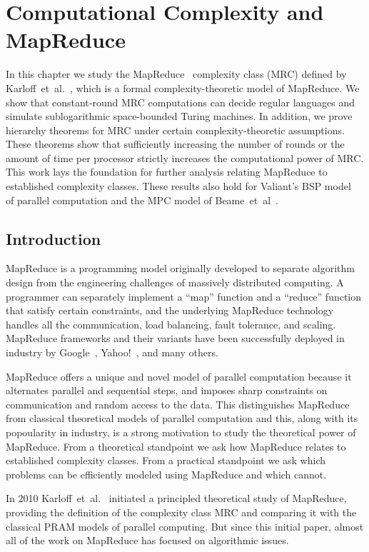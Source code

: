 \chapter{Computational Complexity and MapReduce}
\label{ch:mapreduce}

In this chapter we study the MapReduce~\cite{DeanG08} complexity class (MRC)
defined by Karloff~et~al.~\cite{Karloff10}, which is a formal
complexity-theoretic model of MapReduce. We show that constant-round MRC
computations can decide regular languages and simulate sublogarithmic
space-bounded Turing machines. In addition, we prove hierarchy theorems for MRC
under certain complexity-theoretic assumptions. These theorems show that
sufficiently increasing the number of rounds or the amount of time per
processor strictly increases the computational power of MRC. This work lays the
foundation for further analysis relating MapReduce to established complexity
classes. These results also hold for Valiant's BSP model~\cite{Valiant90} of
parallel computation and the MPC model of Beame~et~al~\cite{BeameKS13}. 

\section{Introduction}

MapReduce is a programming model originally developed to separate algorithm
design from the engineering challenges of massively distributed computing. A
programmer can separately implement a ``map'' function and a ``reduce''
function that satisfy certain constraints, and the underlying MapReduce
technology handles all the communication, load balancing, fault tolerance, and
scaling. MapReduce frameworks and their variants have been successfully
deployed in industry by Google~\cite{DeanG08}, Yahoo!~\cite{ShvachkoKRC10}, and
many others.

MapReduce offers a unique and novel model of parallel computation because it
alternates parallel and sequential steps, and imposes sharp constraints on
communication and random access to the data. This distinguishes MapReduce from
classical theoretical models of parallel computation and this, along with its
popoularity in industry, is a strong motivation to study the theoretical power
of MapReduce. From a theoretical standpoint we ask how MapReduce relates to
established complexity classes. From a practical standpoint we ask which
problems can be efficiently modeled using MapReduce and which cannot.

In 2010 Karloff~et~al.~\cite{Karloff10} initiated a principled theoretical
study of MapReduce, providing the definition of the complexity class MRC and
comparing it with the classical PRAM models of parallel computing. But since
this initial paper, almost all of the work on MapReduce has focused on
algorithmic issues.

